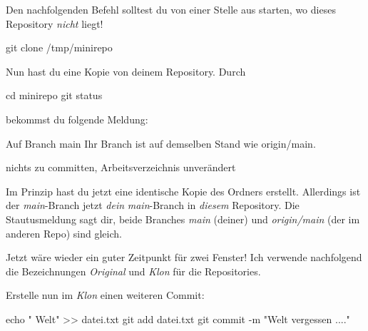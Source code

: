 \documentclass[
  letterpaper,
  DIV=11]{scrreprt}
\newenvironment{Shaded}{\begin{snugshade}}{\end{snugshade}}
\newcommand{\AttributeTok}[1]{\textcolor[rgb]{0.40,0.45,0.13}{#1}}
\newcommand{\BuiltInTok}[1]{\textcolor[rgb]{0.00,0.23,0.31}{#1}}
\newcommand{\ExtensionTok}[1]{\textcolor[rgb]{0.00,0.23,0.31}{#1}}
\newcommand{\FunctionTok}[1]{\textcolor[rgb]{0.28,0.35,0.67}{#1}}
\newcommand{\NormalTok}[1]{\textcolor[rgb]{0.00,0.23,0.31}{#1}}
\newcommand{\OperatorTok}[1]{\textcolor[rgb]{0.37,0.37,0.37}{#1}}
\newcommand{\StringTok}[1]{\textcolor[rgb]{0.13,0.47,0.30}{#1}}
\newcommand{\branch}[1]{\textit{#1}\xspace}
\begin{document}
Den nachfolgenden Befehl solltest du von einer Stelle aus starten, wo
dieses Repository \emph{nicht} liegt!

\begin{Shaded}
\begin{Highlighting}[]
\FunctionTok{git}\NormalTok{ clone /tmp/minirepo }
\end{Highlighting}
\end{Shaded}

Nun hast du eine Kopie von deinem Repository. Durch

\begin{Shaded}
\begin{Highlighting}[]
\BuiltInTok{cd}\NormalTok{ minirepo }
\FunctionTok{git}\NormalTok{ status}
\end{Highlighting}
\end{Shaded}

bekommst du folgende Meldung:

\begin{Shaded}
\begin{Highlighting}[]
\ExtensionTok{Auf}\NormalTok{ Branch main}
\ExtensionTok{Ihr}\NormalTok{ Branch ist auf demselben Stand wie }\StringTok{\textquotesingle{}origin/main\textquotesingle{}}\NormalTok{.}

\ExtensionTok{nichts}\NormalTok{ zu committen, Arbeitsverzeichnis unverändert}
\end{Highlighting}
\end{Shaded}

Im Prinzip hast du jetzt eine identische Kopie des Ordners erstellt.
Allerdings ist der \branch{main}-Branch jetzt \emph{dein}
\branch{main}-Branch in \emph{diesem} Repository. Die Stautusmeldung
sagt dir, beide Branches \emph{main} (deiner) und \emph{origin/main}
(der im anderen Repo) sind gleich.

Jetzt wäre wieder ein guter Zeitpunkt für zwei Fenster! Ich verwende
nachfolgend die Bezeichnungen \emph{Original} und \emph{Klon} für die
Repositories.

Erstelle nun im \emph{Klon} einen weiteren Commit:

\begin{Shaded}
\begin{Highlighting}[]
\BuiltInTok{echo} \StringTok{" Welt"} \OperatorTok{\textgreater{}\textgreater{}}\NormalTok{ datei.txt }
\FunctionTok{git}\NormalTok{ add datei.txt }
\FunctionTok{git}\NormalTok{ commit }\AttributeTok{{-}m} \StringTok{"Welt vergessen ...."}
\end{Highlighting}
\end{Shaded}
\end{document}
